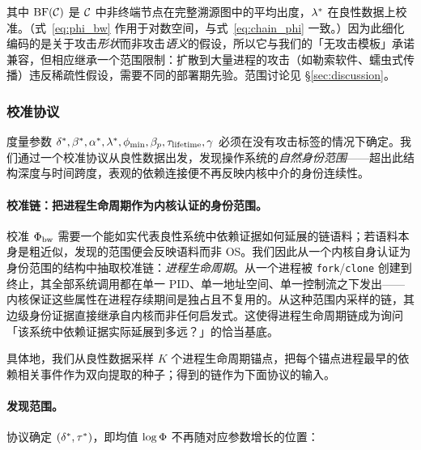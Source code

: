其中 $\operatorname{BF}(\mathcal{C})$ 是 $\mathcal{C}$ 中非终端节点在完整溯源图中的平均出度，$\lambda^*$ 在良性数据上校准。（式~\ref{eq:phi_bw} 作用于对数空间，与式~\ref{eq:chain_phi} 一致。）因为此细化编码的是关于攻击\emph{形状}而非攻击\emph{语义}的假设，所以它与我们的「无攻击模板」承诺兼容，但相应继承一个范围限制：扩散到大量进程的攻击（如勒索软件、蠕虫式传播）违反稀疏性假设，需要不同的部署期先验。范围讨论见 \S\ref{sec:discussion}。

\subsubsection{校准协议}
\label{sec:calibration}

度量参数 $\delta^*, \beta^*, \alpha^*, \lambda^*, \phi_{\min}, \beta_p, \tau_{\text{lifetime}}, \gamma$ 必须在没有攻击标签的情况下确定。我们通过一个校准协议从良性数据出发，发现操作系统的\emph{自然身份范围}——超出此结构深度与时间跨度，表观的依赖连接便不再反映内核中介的身份连续性。

\paragraph{校准链：把进程生命周期作为内核认证的身份范围。}校准 $\Phi_{\text{bw}}$ 需要一个能如实代表良性系统中依赖证据如何延展的链语料；若语料本身是粗近似，发现的范围便会反映语料而非 OS。我们因此从一个内核自身认证为身份范围的结构中抽取校准链：\emph{进程生命周期}。从一个进程被 \texttt{fork}/\texttt{clone} 创建到终止，其全部系统调用都在单一 PID、单一地址空间、单一控制流之下发出——内核保证这些属性在进程存续期间是独占且不复用的。从这种范围内采样的链，其边级身份证据直接继承自内核而非任何启发式。这使得进程生命周期链成为询问「该系统中依赖证据实际延展到多远？」的恰当基底。

具体地，我们从良性数据采样 $K$ 个进程生命周期锚点，把每个锚点进程最早的依赖相关事件作为双向提取的种子；得到的链作为下面协议的输入。

\paragraph{发现范围。}协议确定 $(\delta^*, \tau^*)$，即均值 $\log \Phi$ 不再随对应参数增长的位置：

